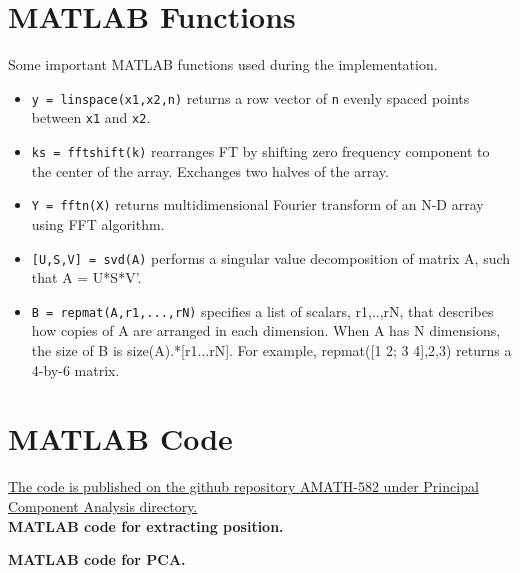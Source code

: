 \documentclass{article}
\begin{document}
\pagebreak
\begin{appendices}

\section{MATLAB Functions}
Some important MATLAB functions used during the implementation.
\begin{itemize}
    \item \texttt{y = linspace(x1,x2,n)} returns a row vector of \texttt{n} evenly spaced points between \texttt{x1} and \texttt{x2}. 
    \item \texttt{ks = fftshift(k)} rearranges FT by shifting zero frequency component to the center of the array. Exchanges two halves of the array.
    \item \texttt{Y = fftn(X)} returns multidimensional Fourier transform of an N-D array using FFT algorithm.
    \item \texttt{[U,S,V] = svd(A)} performs a singular value decomposition of matrix A, such that A = U*S*V'.
    \item \texttt{B = repmat(A,r1,...,rN)} specifies a list of scalars, r1,..,rN, that describes how copies of A are arranged in each dimension. When A has N dimensions, the size of B is size(A).*[r1...rN]. For example, repmat([1 2; 3 4],2,3) returns a 4-by-6 matrix.
\end{itemize}

\pagebreak

\section{MATLAB Code}
\href{https://github.com/cssubedi/AMATH-582}{The code is published on the github repository AMATH-582 under Principal Component Analysis directory.} \\

\textbf{MATLAB code for extracting position.}

\pagebreak
\textbf{MATLAB code for PCA.}



\end{appendices}
\end{document}
